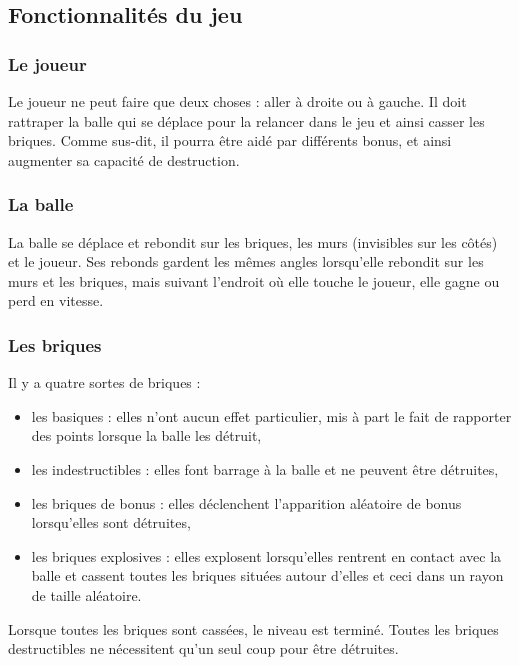 \documentclass[a4paper,10pt]{article}
\begin{document}
\subsection{Fonctionnalités du jeu}
    \subsubsection{Le joueur}
        Le joueur ne peut faire que deux choses : aller à droite ou à gauche. Il doit rattraper la balle
        qui se déplace pour la relancer dans le jeu et ainsi casser les briques. Comme sus-dit, il pourra
        être aidé par différents bonus, et ainsi augmenter sa capacité de destruction.

	\newpage
    \subsubsection{La balle}
        La balle se déplace et rebondit sur les briques, les murs (invisibles sur les côtés) et le joueur.
        Ses rebonds gardent les mêmes angles lorsqu'elle rebondit sur les murs et les briques, mais suivant
        l'endroit où elle touche le joueur, elle gagne ou perd en vitesse.

    \subsubsection{Les briques}
        Il y a quatre sortes de briques :
        \begin{itemize}
            \item les basiques : elles n'ont aucun effet particulier, mis à part le fait de rapporter des points lorsque la balle les détruit,
            \item les indestructibles : elles font barrage à la balle et ne peuvent être détruites,
            \item les briques de bonus : elles déclenchent l'apparition aléatoire de bonus lorsqu'elles sont détruites,
            \item les briques explosives : elles explosent lorsqu'elles rentrent en contact avec la balle et cassent toutes les briques situées autour d'elles
                    et ceci dans un rayon de taille aléatoire.
        \end{itemize}

        Lorsque toutes les briques sont cassées, le niveau est terminé. Toutes les briques destructibles
        ne nécessitent qu'un seul coup pour être détruites.
\end{document}
